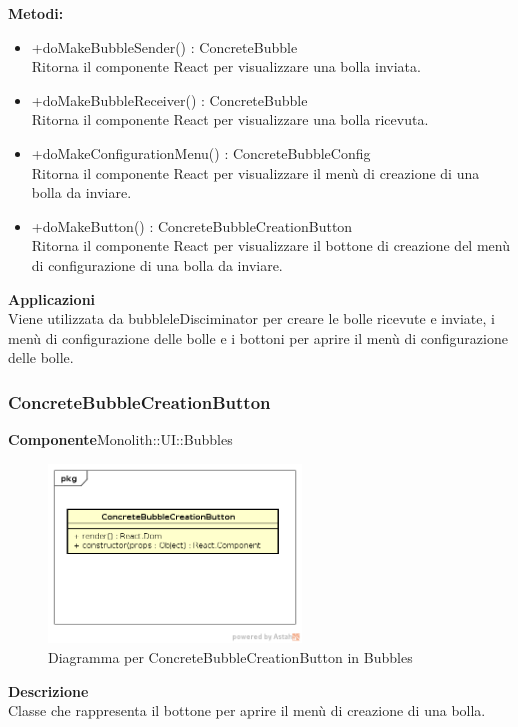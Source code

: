 \textbf{Metodi:} \begin{itemize}
\item +doMakeBubbleSender() : ConcreteBubble \\Ritorna il componente React per visualizzare una bolla inviata.\item +doMakeBubbleReceiver() : ConcreteBubble \\Ritorna il componente React per visualizzare una bolla ricevuta.\item +doMakeConfigurationMenu() : ConcreteBubbleConfig \\Ritorna il componente React per visualizzare il menù di creazione di una bolla da inviare.\item +doMakeButton() : ConcreteBubbleCreationButton \\Ritorna il componente React per visualizzare il bottone di creazione del menù di configurazione di una bolla da inviare.


\end{itemize} 


\textbf{Applicazioni}\\
Viene utilizzata da bubbleleDisciminator per creare le bolle ricevute e inviate, i menù di configurazione delle bolle e i bottoni per aprire il menù di configurazione delle bolle. 


\clearpage

\subsubsection{ConcreteBubbleCreationButton}
\textbf{Componente}Monolith::UI::Bubbles\\
   \FloatBarrier
   \begin{figure}[ht]
   \centering
   \includegraphics[width=0.6\textwidth]{img/single-ConcreteBubbleCreationButton}
   \caption{{Diagramma per ConcreteBubbleCreationButton in Bubbles}}
\end{figure}
\FloatBarrier
\textbf{Descrizione}\\
Classe che rappresenta il bottone per aprire il menù di creazione di una bolla.


